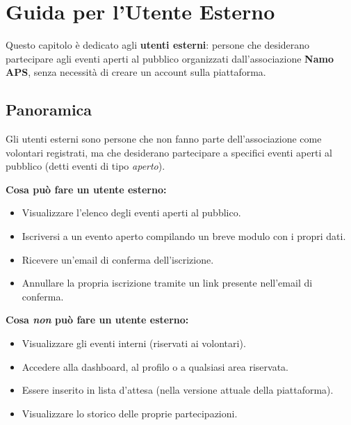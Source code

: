 \documentclass[a4paper,11pt,oneside]{book}
\newcommand{\namoaps}{\textbf{Namo APS}}
\begin{document}
\chapter{Guida per l'Utente Esterno}
\label{ch:utente-esterno}

Questo capitolo \`e dedicato agli \textbf{utenti esterni}: persone che desiderano partecipare agli eventi aperti al pubblico organizzati dall'associazione \namoaps{}, senza necessit\`a di creare un account sulla piattaforma.

\section{Panoramica}
\label{sec:esterno-panoramica}

Gli utenti esterni sono persone che non fanno parte dell'associazione come volontari registrati, ma che desiderano partecipare a specifici eventi aperti al pubblico (detti eventi di tipo \textit{aperto}).

\textbf{Cosa pu\`o fare un utente esterno:}
\begin{itemize}[leftmargin=1.5em]
  \item Visualizzare l'elenco degli eventi aperti al pubblico.
  \item Iscriversi a un evento aperto compilando un breve modulo con i propri dati.
  \item Ricevere un'email di conferma dell'iscrizione.
  \item Annullare la propria iscrizione tramite un link presente nell'email di conferma.
\end{itemize}

\textbf{Cosa \textit{non} pu\`o fare un utente esterno:}
\begin{itemize}[leftmargin=1.5em]
  \item Visualizzare gli eventi interni (riservati ai volontari).
  \item Accedere alla dashboard, al profilo o a qualsiasi area riservata.
  \item Essere inserito in lista d'attesa (nella versione attuale della piattaforma).
  \item Visualizzare lo storico delle proprie partecipazioni.
\end{itemize}
\end{document}
